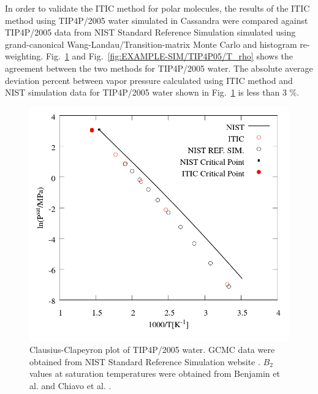 \documentclass[%
 aip,
 jcp,
 sd,%
 amsmath,amssymb,
 reprint,%
]{revtex4-1}
\begin{document}
In order to validate the ITIC method for polar molecules, the results of the ITIC method using TIP4P/2005 water simulated in Cassandra were compared against TIP4P/2005 data from NIST Standard Reference Simulation \cite{Shen2008} simulated using grand-canonical Wang-Landau/Transition-matrix Monte Carlo and histogram re-weighting. Fig.~\ref{fig:EXAMPLE-SIM/TIP4P05/Psat} and Fig.~\ref{fig:EXAMPLE-SIM/TIP4P05/T_rho} shows the agreement between the two methods for TIP4P/2005 water. The absolute average deviation percent between vapor pressure calculated using ITIC method and NIST simulation data for TIP4P/2005 water shown in Fig.~\ref{fig:EXAMPLE-SIM/TIP4P05/Psat} is less than 3 \%. 


\begin{figure}
\includegraphics[scale=0.30]{Figures/EXAMPLE-SIM_TIP4P05_psat.png}
\caption{Clausius-Clapeyron plot of TIP4P/2005 water. GCMC data were obtained from NIST Standard Reference Simulation website \cite{Shen2008}. $B_2$ values at saturation temperatures were obtained from Benjamin et al.\cite{Benjamin2007} and Chiavo et al. \citep{Chialvo2006}. }
\label{fig:EXAMPLE-SIM/TIP4P05/Psat}
\end{figure}
\end{document}
